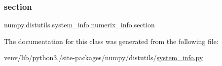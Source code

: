 \subsubsection{\texorpdfstring{section}{section}}
{\footnotesize\ttfamily numpy.\+distutils.\+system\+\_\+info.\+numerix\+\_\+info.\+section\hspace{0.3cm}{\ttfamily [static]}}



The documentation for this class was generated from the following file\+:\begin{DoxyCompactItemize}
\item 
venv/lib/python3./site-\/packages/numpy/distutils/\hyperlink{system__info_8py}{system\+\_\+info.\+py}\end{DoxyCompactItemize}
